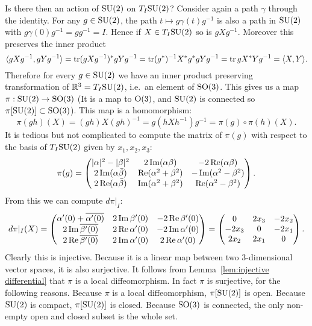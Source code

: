 Is there then an action of $\mathrm{SU}(2)$ on $T_I\mathrm{SU}(2)$?
Consider again a path $\gamma$ through the identity.
For any $g \in \mathrm{SU}(2)$, the path $t \mapsto g\gamma(t)g^{-1}$ is also a path in $\mathrm{SU}(2)$ with $g\gamma(0)g^{-1} = gg^{-1} = I$.
Hence if $X \in T_I\mathrm{SU}(2)$ so is $gXg^{-1}$.
Moreover this preserves the inner product
\[
\langle gXg^{-1}, gYg^{-1} \rangle
= \operatorname{tr} (gXg^{-1})^\ast gYg^{-1}
= \operatorname{tr} (g^\ast)^{-1}X^\ast g^\ast g Y g^{-1}
= \operatorname{tr} g X^\ast Y g^{-1}
= \langle X, Y \rangle.
\]
Therefore for every $g \in \mathrm{SU}(2)$ we have an inner product preserving transformation of $\mathbb{R}^3 = T_I\mathrm{SU}(2)$, i.e.\ an element of $\mathrm{SO}(3)$.
This gives us a map $\pi : \mathrm{SU}(2) \to \mathrm{SO}(3)$ (It is a map to $\mathrm{O}(3)$, and $\mathrm{SU}(2)$ is connected so $\pi[\mathrm{SU}(2)] \subset \mathrm{SO}(3)$).
This map is a homomorphism:
\[
\pi(gh)(X)
= (gh)X(gh)^{-1}
= g(hXh^{-1})g^{-1}
= \pi(g)\circ \pi(h)(X).
\]
It is tedious but not complicated to compute the matrix of $\pi(g)$ with respect to the basis of $T_I\mathrm{SU}(2)$ given by $x_1,x_2,x_3$:
\[
\pi(g)
= \begin{pmatrix}
|\alpha|^2 - |\beta|^2 &  2\operatorname{Im} (\alpha\beta) & -2\operatorname{Re}(\alpha\beta) \\
2\operatorname{Im} (\alpha\bar{\beta}) & \operatorname{Re}(\alpha^2 + \beta^2) & -\operatorname{Im}(\alpha^2 - \beta^2) \\
2\operatorname{Re}(\alpha\bar{\beta}) & \operatorname{Im}(\alpha^2 + \beta^2) & \operatorname{Re}(\alpha^2 - \beta^2)
\end{pmatrix}.
\]
From this we can compute $d\pi|_I$:
\[
d\pi|_I(X)
= \begin{pmatrix}
\alpha'(0) + \overline{\alpha'(0)} &  2\operatorname{Im} \beta'(0) & -2\operatorname{Re}\beta'(0) \\
2\operatorname{Im} \overline{\beta'(0)} & 2\operatorname{Re}\alpha'(0) & -2\operatorname{Im}\alpha'(0) \\
2\operatorname{Re} \overline{\beta'(0)} & 2\operatorname{Im}\alpha'(0) & 2\operatorname{Re}\alpha'(0)
\end{pmatrix}
= \begin{pmatrix}
0 &  2x_3 & -2x_2 \\
-2x_3 & 0 & -2x_1 \\
2x_2 & 2x_1 & 0
\end{pmatrix}.
\]
Clearly this is injective.
Because it is a linear map between two $3$-dimensional vector spaces, it is also surjective.
It follows from Lemma~\ref{lem:injective differential} that $\pi$ is a local diffeomorphism.
In fact $\pi$ is surjective, for the following reasons.
Because $\pi$ is a local diffeomorphism, $\pi[\mathrm{SU}(2)]$ is open.
Because $\mathrm{SU}(2)$ is compact, $\pi[\mathrm{SU}(2)]$ is closed.
Because $\mathrm{SO}(3)$ is connected, the only non-empty open and closed subset is the whole set.

